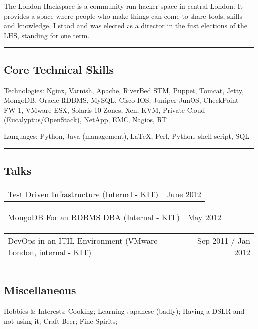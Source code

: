 \documentclass[10pt,a4paper]{article}
\makeatletter
\newenvironment{indentsection}[1]%
{\begin{list}{}%
	{\setlength{\leftmargin}{#1}}%
	\item[]%
}
{\end{list}}
\newcommand{\headerrow}[2]
{\begin{tabular*}{\linewidth}{l@{\extracolsep{\fill}}r}
	#1 &
	#2 \\
\end{tabular*}}
\makeatother
\begin{document}
\begin{itemize}
		The London Hackspace is a community run hacker-space in central London. It provides a space where people who make things can come to share tools, skills and knowledge. I stood and was elected as a director in the first elections of the LHS, standing for one term.


\end{itemize}

\hrule
\vspace{-0.4em}
\subsection*{Core Technical Skills}

\begin{indentsection}{\parindent}
\begin{description*}
	\item[Technologies:]
	Nginx, Varnish, Apache, RiverBed STM, Puppet, Tomcat, Jetty, MongoDB, Oracle RDBMS, MySQL, Cisco IOS, Juniper JunOS, CheckPoint FW-1, VMware ESX, Solaris 10 Zones, Xen, KVM, Private Cloud (Eucalyptus/OpenStack), NetApp, EMC, Nagios, RT
	\item[Languages:]
	Python, Java (management), \LaTeX, Perl, Python, shell script, SQL
\end{description*}
\end{indentsection}




\hrule
\vspace{-0.4em}
\subsection*{Talks}
    \headerrow
		{Test Driven Infrastructure (Internal - KIT)}
		{June 2012}
    \headerrow
		{MongoDB For an RDBMS DBA (Internal - KIT)}
		{May 2012}
    \headerrow
		{DevOps in an ITIL Environment (VMware London, internal - KIT)}
		{Sep 2011 / Jan 2012}

\hrule
\vspace{-0.4em}
\subsection*{Miscellaneous}

\begin{indentsection}{\parindent}
\begin{description*}
	\item[Hobbies \& Interests:]
	Cooking; Learning Japanese (badly); Having a DSLR and not using it; Craft Beer; Fine Spirits;
\end{description*}
\end{indentsection}
\end{document}

